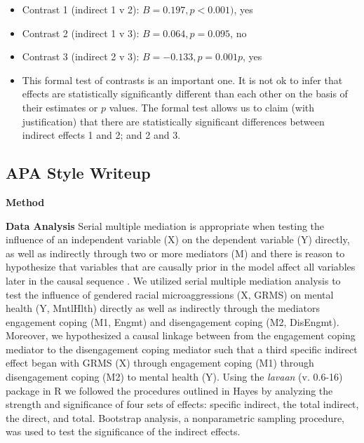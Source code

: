 \documentclass[
  11pt,
]{book}
\providecommand{\tightlist}{%
  \setlength{\itemsep}{0pt}\setlength{\parskip}{0pt}}
\begin{document}
\begin{itemize}
  \begin{itemize}
  \tightlist
  \item
    Contrast 1 (indirect 1 v 2): \(B = 0.197, p <0.001)\), yes
  \item
    Contrast 2 (indirect 1 v 3): \(B = 0.064, p = 0.095\), no
  \item
    Contrast 3 (indirect 2 v 3): \(B = -0.133,p = 0.001p\), yes
  \item
    This formal test of contrasts is an important one. It is not ok to infer that effects are statistically significantly different than each other on the basis of their estimates or \(p\) values. The formal test allows us to claim (with justification) that there are statistically significant differences between indirect effects 1 and 2; and 2 and 3.
  \end{itemize}
\end{itemize}

\hypertarget{apa-style-writeup-2}{%
\subsection{APA Style Writeup}\label{apa-style-writeup-2}}

\textbf{Method}

\textbf{Data Analysis} Serial multiple mediation is appropriate when testing the influence of an independent variable (X) on the dependent variable (Y) directly, as well as indirectly through two or more mediators (M) and there is reason to hypothesize that variables that are causally prior in the model affect all variables later in the causal sequence \citep{hayes_more_2022}. We utilized serial multiple mediation analysis to test the influence of gendered racial microaggressions (X, GRMS) on mental health (Y, MntlHlth) directly as well as indirectly through the mediators engagement coping (M1, Engmt) and disengagement coping (M2, DisEngmt). Moreover, we hypothesized a causal linkage between from the engagement coping mediator to the disengagement coping mediator such that a third specific indirect effect began with GRMS (X) through engagement coping (M1) through disengagement coping (M2) to mental health (Y). Using the \emph{lavaan} (v. 0.6-16) package in R we followed the procedures outlined in Hayes \citeyearpar{hayes_more_2022} by analyzing the strength and significance of four sets of effects: specific indirect, the total indirect, the direct, and total. Bootstrap analysis, a nonparametric sampling procedure, was used to test the significance of the indirect effects.
\end{document}
